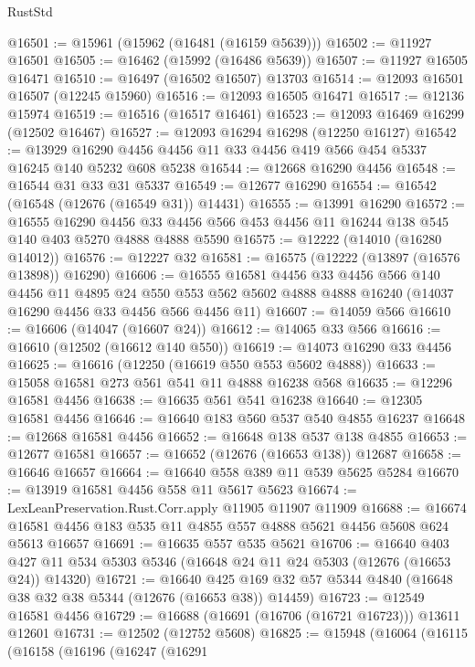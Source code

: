 \begin{lexlean}{RustStd}
\begin{coremodule}
@16501 := @15961 (@15962 (@16481 (@16159 @5639)))
@16502 := @11927 @16501
@16505 := @16462 (@15992 (@16486 @5639))
@16507 := @11927 @16505 @16471
@16510 := @16497 (@16502 @16507) @13703
@16514 := @12093 @16501 @16507 (@12245 @15960)
@16516 := @12093 @16505 @16471
@16517 := @12136 @15974
@16519 := @16516 (@16517 @16461)
@16523 := @12093 @16469 @16299 (@12502 @16467)
@16527 := @12093 @16294 @16298 (@12250 @16127)
@16542 := @13929 @16290 @4456 @4456 @11 @33 @4456 @419 @566 @454 @5337 @16245 @140 @5232 @608 @5238
@16544 := @12668 @16290 @4456
@16548 := @16544 @31 @33 @31 @5337
@16549 := @12677 @16290
@16554 := @16542 (@16548 (@12676 (@16549 @31)) @14431)
@16555 := @13991 @16290
@16572 := @16555
    @16290
    @4456
    @33
    @4456
    @566
    @453
    @4456
    @11
    @16244
    @138
    @545
    @140
    @403
    @5270
    @4888
    @4888
    @5590
@16575 := @12222 (@14010 (@16280 @14012))
@16576 := @12227 @32
@16581 := @16575 (@12222 (@13897 (@16576 @13898)) @16290)
@16606 := @16555
    @16581
    @4456
    @33
    @4456
    @566
    @140
    @4456
    @11
    @4895
    @24
    @550
    @553
    @562
    @5602
    @4888
    @4888
    @16240
    (@14037 @16290 @4456 @33 @4456 @566 @4456 @11)
@16607 := @14059 @566
@16610 := @16606 (@14047 (@16607 @24))
@16612 := @14065 @33 @566
@16616 := @16610 (@12502 (@16612 @140 @550))
@16619 := @14073 @16290 @33 @4456
@16625 := @16616 (@12250 (@16619 @550 @553 @5602 @4888))
@16633 := @15058 @16581 @273 @561 @541 @11 @4888 @16238 @568
@16635 := @12296 @16581 @4456
@16638 := @16635 @561 @541 @16238
@16640 := @12305 @16581 @4456
@16646 := @16640 @183 @560 @537 @540 @4855 @16237
@16648 := @12668 @16581 @4456
@16652 := @16648 @138 @537 @138 @4855
@16653 := @12677 @16581
@16657 := @16652 (@12676 (@16653 @138)) @12687
@16658 := @16646 @16657
@16664 := @16640 @558 @389 @11 @539 @5625 @5284
@16670 := @13919 @16581 @4456 @558 @11 @5617 @5623
@16674 := LexLeanPreservation.Rust.Corr.apply @11905 @11907 @11909
@16688 := @16674 @16581 @4456 @183 @535 @11 @4855 @557 @4888 @5621 @4456 @5608 @624 @5613 @16657
@16691 := @16635 @557 @535 @5621
@16706 := @16640
    @403
    @427
    @11
    @534
    @5303
    @5346
    (@16648 @24 @11 @24 @5303 (@12676 (@16653 @24)) @14320)
@16721 := @16640
    @425
    @169
    @32
    @57
    @5344
    @4840
    (@16648 @38 @32 @38 @5344 (@12676 (@16653 @38)) @14459)
@16723 := @12549 @16581 @4456
@16729 := @16688 (@16691 (@16706 (@16721 @16723))) @13611 @12601
@16731 := @12502 (@12752 @5608)
@16825 := @15948
    (@16064
      (@16115
        (@16158
          (@16196
            (@16247
              (@16291

\end{coremodule}
\end{lexlean}
